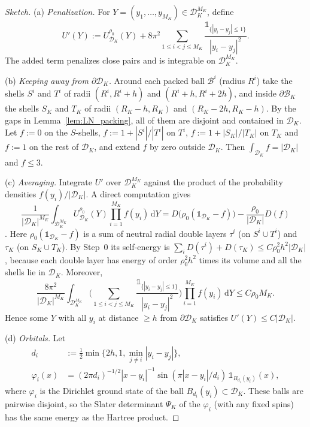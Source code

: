 \documentclass[final,reqno]{amsart}
\theoremstyle{remark}
\theoremstyle{definition}
\renewcommand{\le}{\leqslant}
\renewcommand{\ge}{\geqslant}
\newcommand{\iden}{\mathbb{1}}
\begin{document}
\begin{proof}[Sketch]

(a) \emph{Penalization.} For $Y=(y_1,\ldots,y_{M_K})\in\mathcal D_K^{M_K}$, define
\[
U'(Y):=U^{\rho_0}_{\mathcal D_K}(Y)
+8\pi^2\sum_{1\le i<j\le M_K}\frac{\iden_{\{|y_i-y_j|\le1\}}}{|y_i-y_j|^2}.
\]
The added term penalizes close pairs and is integrable on $\mathcal D_K^{M_K}$.

(b) \emph{Keeping away from $\partial\mathcal D_K$.} Around each packed ball $\mathcal B^i$ (radius $R^i$) take the shells $S^i$ and $T^i$ of radii $(R^i,R^i+h)$ and $(R^i+h,R^i+2h)$, and inside $\partial \mathcal B_K$ the shells $S_K$ and $T_K$ of radii $(R_K-h,R_K)$ and $(R_K-2h,R_K-h)$. By the gaps in Lemma~\ref{lem:LN_packing}, all of them are disjoint and contained in $\mathcal D_K$. Let $f:=0$ on the $S$-shells, $f:=1+|S^i|/|T^i|$ on $T^i$, $f:=1+|S_K|/|T_K|$ on $T_K$ and $f:=1$ on the rest of $\mathcal D_K$, and extend $f$ by zero outside $\mathcal D_K$. Then $\int_{\mathcal D_K}f=|\mathcal D_K|$ and $f\le3$.

(c) \emph{Averaging.} Integrate $U'$ over $\mathcal D_K^{M_K}$ against the product of the probability densities $f(y_i)/|\mathcal D_K|$. A direct computation gives
\[
\frac1{|\mathcal D_K|^{M_K}}\int_{\mathcal D_K^{M_K}}U^{\rho_0}_{\mathcal D_K}(Y)\prod_{i=1}^{M_K} f(y_i)\,\mathrm dY
=D\big(\rho_0(\iden_{\mathcal D_K}-f)\big)-\frac{\rho_0}{|\mathcal D_K|}D(f)
\]
\cite[Eq.~(49)]{lieb1975thermodynamic}. Here $\rho_0(\iden_{\mathcal D_K}-f)$ is a sum of neutral radial double layers $\tau^i$ (on $S^i\cup T^i$) and $\tau_K$ (on $S_K\cup T_K$). By Step~0 its self-energy is $\sum_iD(\tau^i)+D(\tau_K)\le C\rho_0^2h^2|\mathcal D_K|$, because each double layer has energy of order $\rho_0^2h^2$ times its volume and all the shells lie in $\mathcal D_K$. Moreover,
\[
\frac{8\pi^2}{|\mathcal D_K|^{M_K}}\int_{\mathcal D_K^{M_K}}
\Bigg(\sum_{1\le i<j\le M_K}\frac{\iden_{\{|y_i-y_j|\le1\}}}{|y_i-y_j|^2}\Bigg)
\prod_{i=1}^{M_K} f(y_i)\,\mathrm dY
\le C\rho_0M_K.
\]
Hence some $Y$ with all $y_i$ at distance $\ge h$ from $\partial\mathcal D_K$ satisfies $U'(Y)\le C|\mathcal D_K|$.

(d) \emph{Orbitals.} Let
\begin{align*}
d_i&:=\frac12\min\{2h,1,\min_{j\ne i}|y_i-y_j|\},\\
\varphi_i(x)&=(2\pi d_i)^{-1/2}|x-y_i|^{-1}\sin(\pi|x-y_i|/d_i)\,\iden_{B_{d_i}(y_i)}(x),
\end{align*}
where $\varphi_i$ is the Dirichlet ground state of the ball $B_{d_i}(y_i)\subset\mathcal D_K$. These balls are pairwise disjoint, so the Slater determinant $\Psi_K$ of the $\varphi_i$ (with any fixed spins) has the same energy as the Hartree product.


\end{proof}
\end{document}
